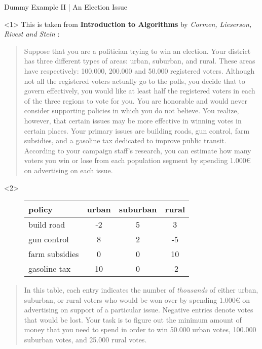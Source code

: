 \documentclass[aspectratio = 169]{beamer}
\begin{document}
\begin{frame}{Dummy Example II | An Election Issue}
  \begin{onlyenv}<1>
    This is taken from \textbf{Introduction to Algorithms} by
    \emph{Cormen, Lieserson, Rivest and Stein} :
    \begin{quotation}
      Suppose that you are a politician trying to win an
      election. Your district has three different types of areas:
      urban, suburban, and rural. These areas have respectively:
      100.000, 200.000 and 50.000 registered voters. Although not
      all the registered voters actually go to the polls, you
      decide that to govern effectively, you would like at least
      half the registered voters in each of the three regions to
      vote for you. You are honorable and would never consider
      supporting policies in which you do not believe. You
      realize, however, that certain issues may be more effective
      in winning votes in certain places. Your primary issues are
      building roads, gun control, farm subsidies, and a gasoline
      tax dedicated to improve public transit. According to your
      campaign staff's research, you can estimate how many voters
      you win or lose from each population segment by spending
      1.000€ on advertising on each issue.
    \end{quotation}
  \end{onlyenv}
  \begin{onlyenv}<2>
    \begin{figure}
      \begin{tabular}{l|ccc}
        policy & urban & suburban & rural \\
        \hline
        build road & -2 & 5 & 3 \\
        gun control & 8 & 2 & -5 \\
        farm subsidies & 0 & 0 & 10 \\
        gasoline tax & 10 & 0 & -2
      \end{tabular}
    \end{figure}
    \begin{quotation}
      In this table, each entry indicates the number of
      \emph{thousands} of either urban, suburban, or rural voters
      who would be won over by spending 1.000€ on advertising on
      support of a particular issue. Negative entries denote votes
      that would be lost. Your task is to figure out the minimum
      amount of money that you need to spend in order to win
      50.000 urban votes, 100.000 suburban votes, and 25.000 rural
      votes.
    \end{quotation}
  \end{onlyenv}
\end{frame}
\end{document}
